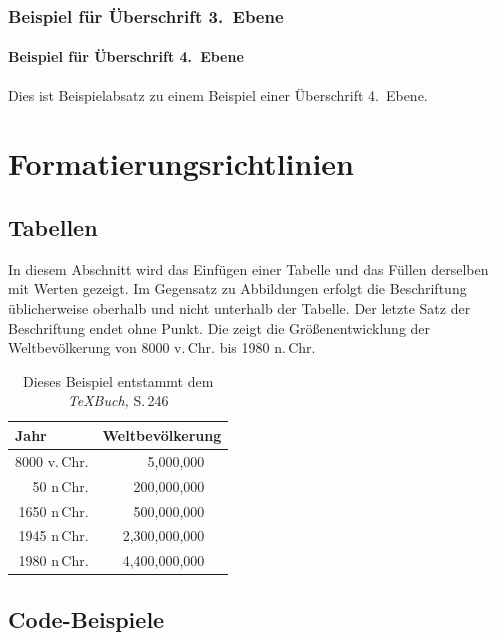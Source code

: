 \documentclass[runningheads,a4paper]{llncs}[2015/06/24]
\begin{document}
\subsubsection{Beispiel für Überschrift 3.~Ebene}

\paragraph{Beispiel für Überschrift 4.~Ebene}
Dies ist Beispielabsatz zu einem Beispiel einer Überschrift 4.~Ebene.

\section{Formatierungsrichtlinien}

\subsection{Tabellen}
In diesem Abschnitt wird das Einfügen einer Tabelle und das Füllen derselben mit Werten gezeigt.
Im Gegensatz zu Abbildungen erfolgt die Beschriftung üblicherweise oberhalb und nicht unterhalb der Tabelle.
Der letzte Satz der Beschriftung endet ohne Punkt.
Die  zeigt die Größenentwicklung der Weltbevölkerung von 8000 v.\,Chr. bis 1980 n.\,Chr.

\begin{table}
\caption{Dieses Beispiel entstammt dem {\it\TeX{}Buch,} S.\,246}
\label{tab:bsp}
\begin{center}
\begin{tabular}{r@{\quad}rl}
\hline
\multicolumn{1}{l}{\rule{0pt}{12pt}
                   Jahr}&\multicolumn{2}{l}{Weltbevölkerung}\\[2pt]
\hline\rule{0pt}{12pt}
8000 v.\,Chr. &     5,000,000& \\
  50 n\,Chr. &   200,000,000& \\
1650 n\,Chr. &   500,000,000& \\
1945 n\,Chr. & 2,300,000,000& \\
1980 n\,Chr. & 4,400,000,000& \\[2pt]
\hline
\end{tabular}
\end{center}
\end{table}

\subsection{Code-Beispiele}
\end{document}
